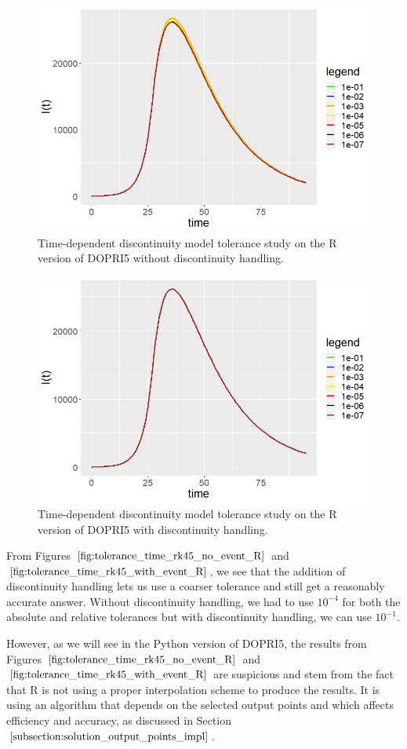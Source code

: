 \begin{figure}[H]
\centering
\includegraphics[width=0.7\linewidth]{./figures/tolerance_time_rk45_no_event_R}
\caption{Time-dependent discontinuity model tolerance study on the R version of DOPRI5 without discontinuity handling.}
\label{fig:tolerance_time_rk45_no_event_R}
\end{figure}

\begin{figure}[H]
\centering
\includegraphics[width=0.7\linewidth]{./figures/tolerance_time_rk45_with_event_R}
\caption{Time-dependent discontinuity model tolerance study on the R version of DOPRI5 with discontinuity handling.}
\label{fig:tolerance_time_rk45_with_event_R}
\end{figure}

From Figures $\ref{fig:tolerance_time_rk45_no_event_R}$ and $\ref{fig:tolerance_time_rk45_with_event_R}$, we see that the addition of discontinuity handling lets us use a coarser tolerance and still get a reasonably accurate answer. Without discontinuity handling, we had to use $10^{-4}$ for both the absolute and relative tolerances but with discontinuity handling, we can use $10^{-1}$. 

However, as we will see in the Python version of DOPRI5, the results from Figures $\ref{fig:tolerance_time_rk45_no_event_R}$ and $\ref{fig:tolerance_time_rk45_with_event_R}$ are suspicious and stem from the fact that R is not using a proper interpolation scheme to produce the results. It is using an algorithm that depends on the selected output points and which affects efficiency and accuracy, as discussed in Section $\ref{subsection:solution_output_points_impl}$. 

